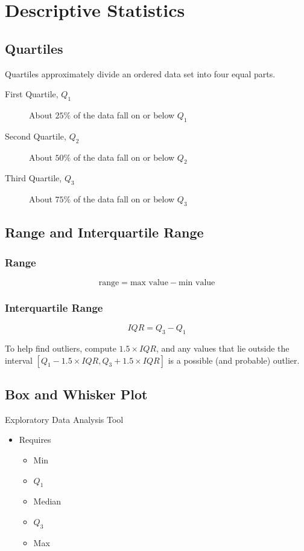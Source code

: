 \documentclass{article}
\begin{document}
\section{Descriptive Statistics}

\subsection{Quartiles}

Quartiles approximately divide an ordered data set into four equal parts.

\begin{description}
\item[First Quartile, $Q_1$]
About $25\%$ of the data fall on or below $Q_1$
\item[Second Quartile, $Q_2$]
About $50\%$ of the data fall on or below $Q_2$
\item[Third Quartile, $Q_3$]
About $75\%$ of the data fall on or below $Q_3$
\end{description}

\subsection{Range and Interquartile Range}

\subsubsection{Range}

$$\text{range} = \text{max value} - \text{min value}$$

\subsubsection{Interquartile Range}

$$IQR=Q_3 - Q_1$$

To help find outliers, compute $1.5 \times IQR$, and any values that lie outside the interval $[Q_1-1.5 \times IQR, Q_3+1.5 \times IQR]$ is a possible (and probable) outlier.

\subsection{Box and Whisker Plot}

Exploratory Data Analysis Tool

\begin{itemize}
\item Requires
	\begin{itemize}
	\item Min
	\item $Q_1$
	\item Median
	\item $Q_3$
	\item Max
	\end{itemize}
\end{itemize}
\end{document}
